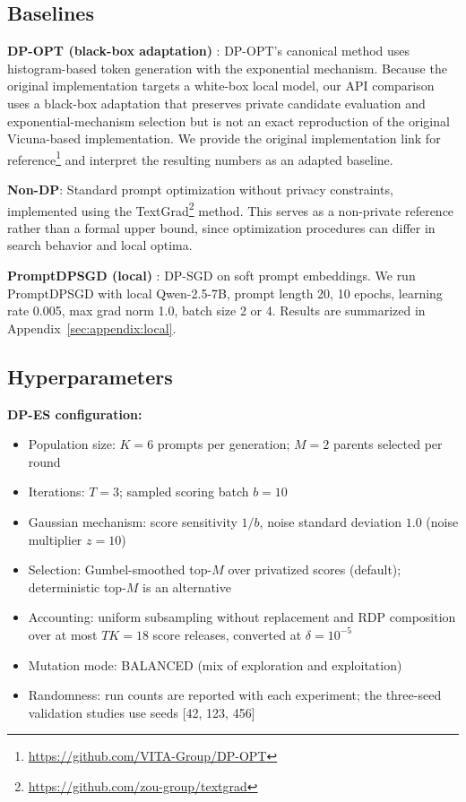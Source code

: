 \subsection{Baselines}

\textbf{DP-OPT (black-box adaptation)} \cite{hong2024dpopt}: DP-OPT's canonical method uses histogram-based token generation with the exponential mechanism. Because the original implementation targets a white-box local model, our API comparison uses a black-box adaptation that preserves private candidate evaluation and exponential-mechanism selection but is not an exact reproduction of the original Vicuna-based implementation. We provide the original implementation link for reference\footnote{\url{https://github.com/VITA-Group/DP-OPT}} and interpret the resulting numbers as an adapted baseline.

\noindent \textbf{Non-DP}: Standard prompt optimization without privacy constraints, implemented using the TextGrad\footnote{\url{https://github.com/zou-group/textgrad}} \cite{yuksekgonul2024textgrad}
 method. This serves as a non-private reference rather than a formal upper bound, since optimization procedures can differ in search behavior and local optima.

\noindent \textbf{PromptDPSGD (local)} \cite{Duan2023FlocksOS}: DP-SGD on soft prompt embeddings. We run PromptDPSGD with local Qwen-2.5-7B, prompt length 20, 10 epochs, learning rate 0.005, max grad norm 1.0, batch size 2 or 4. Results are summarized in Appendix~\ref{sec:appendix:local}.


\subsection{Hyperparameters}

\textbf{DP-ES configuration:}
\begin{itemize}
    \item Population size: $K=6$ prompts per generation; $M=2$ parents selected per round
    \item Iterations: $T=3$; sampled scoring batch $b=10$
    \item Gaussian mechanism: score sensitivity $1/b$, noise standard deviation $1.0$ (noise multiplier $z=10$)
    \item Selection: Gumbel-smoothed top-$M$ over privatized scores (default); deterministic top-$M$ is an alternative
    \item Accounting: uniform subsampling without replacement and RDP composition over at most $TK=18$ score releases, converted at $\delta=10^{-5}$
    \item Mutation mode: BALANCED (mix of exploration and exploitation)
    \item Randomness: run counts are reported with each experiment; the three-seed validation studies use seeds [42, 123, 456]
\end{itemize}

